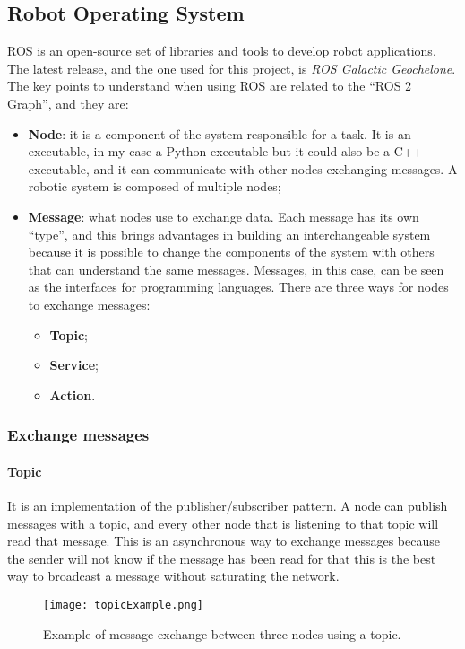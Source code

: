 \documentclass[../thesis.tex]{subfiles}
\begin{document}
\subsection{Robot Operating System}
\acrfull{ROS} is an open-source set of libraries and tools to develop robot applications. The latest release, and the one used for this project, is \textit{ROS Galactic Geochelone}. The key points to understand when using \acrshort{ROS} are related to the ``ROS 2 Graph'', and they are:
\begin{itemize}
    \item \textbf{Node}: it is a component of the system responsible for a task. It is an executable, in my case a Python executable but it could also be a C++ executable, and it can communicate with other nodes exchanging messages. A robotic system is composed of multiple nodes;
    \item \textbf{Message}: what nodes use to exchange data. Each message has its own ``type'', and this brings advantages in building an interchangeable system because it is possible to change the components of the system with others that can understand the same messages. Messages, in this case, can be seen as the interfaces for programming languages. There are three ways for nodes to exchange messages:
        \begin{itemize}
            \item \textbf{Topic};
            \item \textbf{Service};
            \item \textbf{Action}.
        \end{itemize}
\end{itemize}
\subsubsection{Exchange messages}
\paragraph{Topic}
It is an implementation of the publisher/subscriber pattern. A node can publish messages with a topic, and every other node that is listening to that topic will read that message. This is an asynchronous way to exchange messages because the sender will not know if the message has been read for that this is the best way to broadcast a message without saturating the network.
\begin{figure}[H]
    \centering
    \texttt{[image: topicExample.png]}
    \caption{Example of message exchange between three nodes using a topic.}
    \label{fig:exampleTopicExchangeMessage}
\end{figure}
\end{document}
